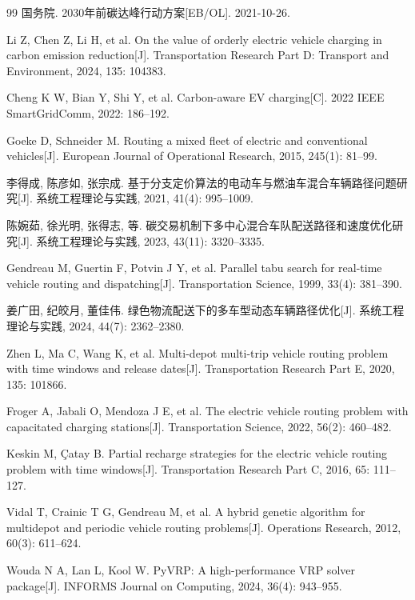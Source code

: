 \documentclass[UTF8]{setp-new}
\begin{document}
\begin{thebibliography}{99}
国务院. 2030年前碳达峰行动方案[EB/OL]. 2021-10-26.

Li Z, Chen Z, Li H, et al. On the value of orderly electric vehicle charging in carbon emission reduction[J]. Transportation Research Part D: Transport and Environment, 2024, 135: 104383.

Cheng K W, Bian Y, Shi Y, et al. Carbon-aware EV charging[C]. 2022 IEEE SmartGridComm, 2022: 186--192.

Goeke D, Schneider M. Routing a mixed fleet of electric and conventional vehicles[J]. European Journal of Operational Research, 2015, 245(1): 81--99.

李得成, 陈彦如, 张宗成. 基于分支定价算法的电动车与燃油车混合车辆路径问题研究[J]. 系统工程理论与实践, 2021, 41(4): 995--1009.

陈婉茹, 徐光明, 张得志, 等. 碳交易机制下多中心混合车队配送路径和速度优化研究[J]. 系统工程理论与实践, 2023, 43(11): 3320--3335.

Gendreau M, Guertin F, Potvin J Y, et al. Parallel tabu search for real-time vehicle routing and dispatching[J]. Transportation Science, 1999, 33(4): 381--390.

姜广田, 纪皎月, 董佳伟. 绿色物流配送下的多车型动态车辆路径优化[J]. 系统工程理论与实践, 2024, 44(7): 2362--2380.

Zhen L, Ma C, Wang K, et al. Multi-depot multi-trip vehicle routing problem with time windows and release dates[J]. Transportation Research Part E, 2020, 135: 101866.

Froger A, Jabali O, Mendoza J E, et al. The electric vehicle routing problem with capacitated charging stations[J]. Transportation Science, 2022, 56(2): 460--482.

Keskin M, Çatay B. Partial recharge strategies for the electric vehicle routing problem with time windows[J]. Transportation Research Part C, 2016, 65: 111--127.

Vidal T, Crainic T G, Gendreau M, et al. A hybrid genetic algorithm for multidepot and periodic vehicle routing problems[J]. Operations Research, 2012, 60(3): 611--624.

Wouda N A, Lan L, Kool W. PyVRP: A high-performance VRP solver package[J]. INFORMS Journal on Computing, 2024, 36(4): 943--955.

\end{thebibliography}
\end{document}
